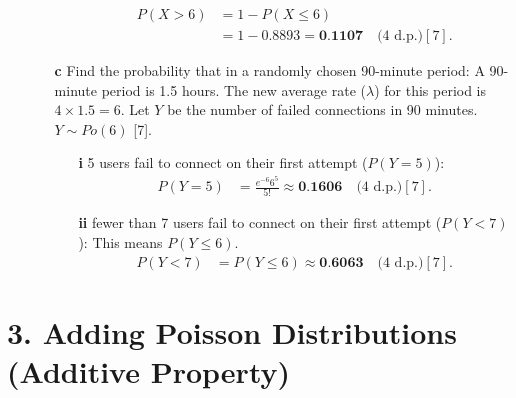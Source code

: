 \documentclass[12pt]{article}
\begin{document}
\begin{itemize}
\begin{enumerate}
\begin{enumerate}
            \begin{align*}
            P(X > 6) &= 1 - P(X \le 6) \\
            &= 1 - 0.8893 = \textbf{0.1107} \quad \text{(4 d.p.)} [7].
            \end{align*}
        \end{enumerate}
        \item[\textbf{c}] Find the probability that in a randomly chosen 90-minute period:
        A 90-minute period is 1.5 hours. The new average rate ($\lambda$) for this period is $4 \times 1.5 = 6$.
        Let $Y$ be the number of failed connections in 90 minutes. $Y \sim Po(6)$ [7].
        \begin{enumerate}
            \item[\textbf{i}] 5 users fail to connect on their first attempt ($P(Y=5)$):
            \begin{align*}
            P(Y=5) &= \frac{e^{-6} 6^5}{5!} \approx \textbf{0.1606} \quad \text{(4 d.p.)} [7].
            \end{align*}
            \item[\textbf{ii}] fewer than 7 users fail to connect on their first attempt ($P(Y < 7)$):
            This means $P(Y \le 6)$.
            \begin{align*}
            P(Y < 7) &= P(Y \le 6) \approx \textbf{0.6063} \quad \text{(4 d.p.)} [7].
            \end{align*}
        \end{enumerate}
    \end{enumerate}
\end{itemize}

\section*{3. Adding Poisson Distributions (Additive Property)}
\end{document}
